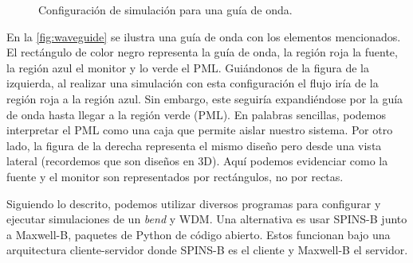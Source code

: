 \begin{figure}[ht]
  \centering
  \hfill

  \caption{Configuración de simulación para una guía de onda.}
  \label{fig:waveguide}
\end{figure}

En la \autoref{fig:waveguide} se ilustra una guía de onda con los elementos mencionados.
El rectángulo de color negro representa la guía de onda, la región roja la fuente, 
la región azul el monitor y lo verde el PML.
Guiándonos de la figura de la izquierda, al realizar una simulación con esta configuración 
el flujo iría de la región roja a la región azul.
Sin embargo, este seguiría expandiéndose por la guía de onda hasta llegar a la región verde (PML).
En palabras sencillas, podemos interpretar el PML como una caja que permite aislar nuestro sistema.
Por otro lado, la figura de la derecha representa el mismo diseño pero desde una vista lateral 
(recordemos que son diseños en 3D).
Aquí podemos evidenciar como la fuente y el monitor son representados por rectángulos, no por rectas.

Siguiendo lo descrito, podemos utilizar diversos programas para configurar y ejecutar 
simulaciones de un \emph{bend} y WDM.
Una alternativa es usar SPINS-B junto a Maxwell-B, paquetes de Python de código
abierto.
Estos funcionan bajo una arquitectura cliente-servidor donde SPINS-B es el cliente y Maxwell-B el servidor.

